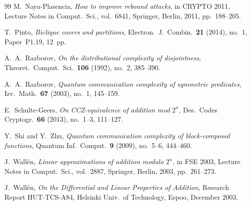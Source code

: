 \documentclass[11pt,reqno]{amsart}
\theoremstyle{definition}
\theoremstyle{remark}
\numberwithin{equation}{section}
\begin{document}
\begin{thebibliography}{99}
 M.~Naya-Plasencia, \emph{How to improve rebound attacks}, in CRYPTO 2011, Lecture Notes in Comput.\ Sci., vol.~6841, Springer, Berlin, 2011, pp.~188--205.

 T.~Pinto, \emph{Biclique covers and partitions}, Electron.\ J.\ Combin.\ \textbf{21} (2014), no.~1, Paper~P1.19, 12~pp.

 A.~A.~Razborov, \emph{On the distributional complexity of disjointness}, Theoret.\ Comput.\ Sci.\ \textbf{106} (1992), no.~2, 385--390.

 A.~A.~Razborov, \emph{Quantum communication complexity of symmetric predicates}, Izv.\ Math.\ \textbf{67} (2003), no.~1, 145--159.

 E.~Schulte-Geers, \emph{On CCZ-equivalence of addition mod $2^n$}, Des.\ Codes Cryptogr.\ \textbf{66} (2013), no.~1--3, 111--127.

 Y.~Shi and Y.~Zhu, \emph{Quantum communication complexity of block-composed functions}, Quantum Inf.\ Comput.\ \textbf{9} (2009), no.~5--6, 444--460.

 J.~Wall\'en, \emph{Linear approximations of addition modulo $2^n$}, in FSE 2003, Lecture Notes in Comput.\ Sci., vol.~2887, Springer, Berlin, 2003, pp.~261--273.

 J.~Wall\'en, \emph{On the Differential and Linear Properties of Addition}, Research Report HUT-TCS-A84, Helsinki Univ.\ of Technology, Espoo, December 2003.

\end{thebibliography}
\end{document}
